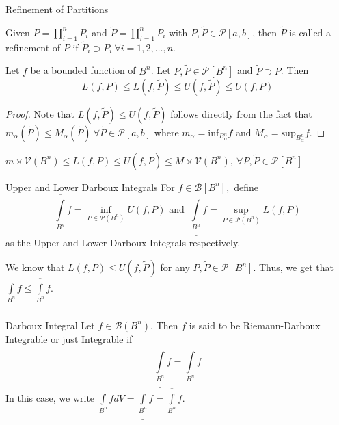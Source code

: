 \documentclass[../Analysis-3.tex]{subfiles}
\begin{document}
\begin{Def}{Refinement of Partitions}{}

  Given $P = \prod \limits _{i=1}^n P_i$ and $\widetilde{P} = \prod \limits _{i=1}^n \widetilde{P}_{i}$ with $P, \widetilde{P} \in \mathcal{P}[a,b]$, then $\widetilde{P}$ is called a refinement of $P$ if $\widetilde{P}_{i} \supset P_i \ \forall i = 1,2, \dots, n$.

\end{Def}

\begin{Thm}{}{}

  Let $f$ be a bounded function of $B^n$. Let $P, \widetilde{P} \in \mathcal{P}[B^n]$ and $\widetilde{P} \supset P$. Then
  \[L(f,P) \leq L(f, \widetilde{P}) \leq U(f,\widetilde{P}) \leq U(f,P)\]

\end{Thm}

\begin{proof}
  Note that $L(f, \widetilde{P}) \leq U(f,\widetilde{P})$ follows directly from the fact that $m_\alpha (\widetilde{P}) \leq M_\alpha (\widetilde{P})\ \forall \widetilde{P} \in \mathcal{P}[a,b]$ where $m_\alpha = \text{inf}_{B^n_\alpha} f$ and $M_\alpha = \text{sup}_{B_\alpha ^n} f$.
\end{proof}

\begin{Cor}{}{}
  $m \times \mathcal{V}(B^n) \leq L(f,P) \leq U(f, \widetilde{P}) \leq M \times \mathcal{V}(B^n),\ \forall P, \widetilde{P} \in \mathcal{P}[B^n]$
\end{Cor}

\begin{Def}{Upper and Lower Darboux Integrals}{}
  For $f \in \mathcal{B}[B^n],$ define
  $$\overline{\int \limits _{B^n}} f = \inf_{P \in \mathcal{P}(B^n)} U(f,P) \text{  and }\  \underline{\int \limits _{B^n}} f = \sup_{P \in \mathcal{P}(B^n)} L(f,P)$$
  as the Upper and Lower Darboux Integrals respectively.
\end{Def}

We know that $L(f,P) \leq U(f, \widetilde{P})$ for any $P, \widetilde{P} \in \mathcal{P}[B^n]$. Thus, we get that $\underline{\int \limits _{B^n}} f \leq \overline{\int \limits _{B^n}} f$.

\begin{Def}{Darboux Integral}{}
  Let $f \in \mathcal{B}(B^n)$. Then $f$ is said to be Riemann-Darboux Integrable or just Integrable if
  \[\underline{\int \limits _{B^n}} f = \overline{\int \limits _{B^n}} f\]
  In this case, we write $\int \limits_{B^n}f dV = \underline{\int \limits _{B^n}} f = \overline{\int \limits _{B^n}} f$.
\end{Def}
\end{document}
